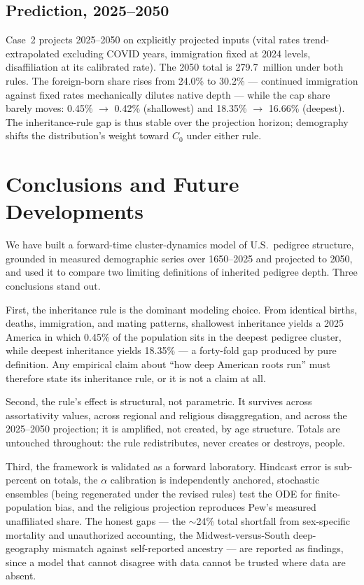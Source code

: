 \documentclass[11pt,a4paper]{article}
\begin{document}
\subsection{Prediction, 2025--2050}
\label{sec:case2}
Case~2 projects 2025--2050 on explicitly projected inputs (vital rates
trend-extrapolated excluding COVID years, immigration fixed at 2024
levels, disaffiliation at its calibrated rate).  The 2050 total is
279.7~million under both rules.  The foreign-born share rises from
24.0\% to 30.2\% --- continued immigration against fixed rates
mechanically dilutes native depth --- while the cap share barely moves:
0.45\% $\to$ 0.42\% (shallowest) and 18.35\% $\to$ 16.66\% (deepest).
The inheritance-rule gap is thus stable over the projection horizon;
demography shifts the distribution's weight toward $C_0$ under either
rule.
\section{Conclusions and Future Developments}
\label{sec:conclusions}

We have built a forward-time cluster-dynamics model of U.S.\ pedigree
structure, grounded in measured demographic series over 1650--2025 and
projected to 2050, and used it to compare two limiting definitions of
inherited pedigree depth.  Three conclusions stand out.

First, the inheritance rule is the dominant modeling choice.  From
identical births, deaths, immigration, and mating patterns, shallowest
inheritance yields a 2025 America in which 0.45\% of the population
sits in the deepest pedigree cluster, while deepest inheritance yields
18.35\% --- a forty-fold gap produced by pure definition.  Any
empirical claim about ``how deep American roots run'' must therefore
state its inheritance rule, or it is not a claim at all.

Second, the rule's effect is structural, not parametric.  It survives
across assortativity values, across regional and religious
disaggregation, and across the 2025--2050 projection; it is amplified,
not created, by age structure.  Totals are untouched throughout: the
rule redistributes, never creates or destroys, people.

Third, the framework is validated as a forward laboratory.  Hindcast
error is sub-percent on totals, the $\alpha$ calibration is
independently anchored, stochastic ensembles (being regenerated under
the revised rules) test the ODE for finite-population bias,
and the religious projection reproduces Pew's measured unaffiliated
share.  The honest gaps --- the $\sim$24\% total shortfall from
sex-specific mortality and unauthorized accounting, the
Midwest-versus-South deep-geography mismatch against self-reported
ancestry --- are reported as findings, since a model that cannot
disagree with data cannot be trusted where data are absent.
\end{document}
